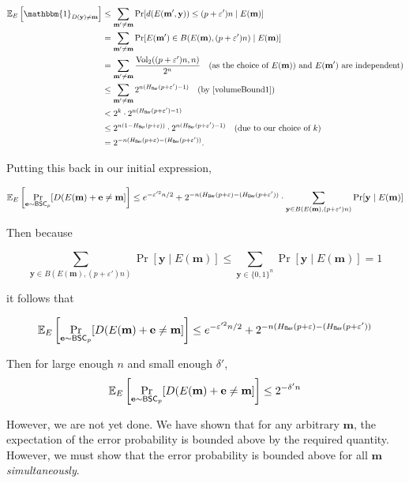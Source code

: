\begin{align*}
    \expec_E\left[\mathbbm{1}_{D(\textbf{y})\neq \textbf{m}}\right] &\leq \sum_{\textbf{m}'\neq \textbf{m}} \Pr[d(E(\textbf{m}', \textbf{y}))\leq (p+\varepsilon')n\mid E(\textbf{m})] \\
    &= \sum_{\textbf{m}'\neq \textbf{m}} \Pr[E(\textbf{m}')\in B(E(\textbf{m}), (p+\varepsilon')n)\mid E(\textbf{m})] \\
    &= \sum_{\textbf{m}'\neq \textbf{m}} \frac{\Vol_2((p+\varepsilon')n, n)}{2^n} \quad\text{(as the choice of $E(\textbf{m})$) and $E(\textbf{m}')$ are independent)} \\
    &\leq \sum_{\textbf{m}'\neq \textbf{m}} 2^{n(H_\mathsf{Ber}(p+\varepsilon')-1)}\quad\text{(by \ref{volumeBound1})} \\
    &< 2^k\cdot 2^{n(H_\mathsf{Ber}(p+\varepsilon')-1)} \\
    &\leq 2^{n(1-H_\mathsf{Ber}(p+\varepsilon))}\cdot 2^{n(H_\mathsf{Ber}(p+\varepsilon')-1)}\quad\text{(due to our choice of $k$)} \\
    &= 2^{-n(H_\mathsf{Ber}(p+\varepsilon)-(H_\mathsf{Ber}(p+\varepsilon'))}.
\end{align*}

Putting this back in our initial expression, 

$$\mathbb{E}_E\left[\Pr_{\textbf{e}\sim\mathsf{BSC}_p}[D(E(\textbf{m})+\textbf{e}\neq \textbf{m}]\right]
\leq
e^{-\varepsilon'^2n/2} +
2^{-n(H_\mathsf{Ber}(p+\varepsilon)-(H_\mathsf{Ber}(p+\varepsilon'))} \cdot
\sum_{\textbf{y}\in B(E(\textbf{m}), (p+\varepsilon')n)}\Pr[\textbf{y}\mid E(\textbf{m})]$$

Then because

$$\sum_{\textbf{y}\in B(E(\textbf{m}), (p+\varepsilon')n)}\Pr[\textbf{y}\mid E(\textbf{m})]\leq \sum_{\textbf{y}\in \{0,1\}^n}\Pr[\textbf{y}\mid E(\textbf{m})]=1$$

it follows that

$$\mathbb{E}_E\left[\Pr_{\textbf{e}\sim\mathsf{BSC}_p}[D(E(\textbf{m})+\textbf{e}\neq \textbf{m}]\right]
\leq
e^{-\varepsilon'^2n/2} +
2^{-n(H_\mathsf{Ber}(p+\varepsilon)-(H_\mathsf{Ber}(p+\varepsilon'))}$$

Then for large enough $n$ and small enough $\delta'$, 
$$\mathbb{E}_E\left[\Pr_{\textbf{e}\sim\mathsf{BSC}_p}[D(E(\textbf{m})+\textbf{e}\neq \textbf{m}]\right]
\leq
2^{-\delta'n}
$$

However, we are not yet done. We have shown that for any arbitrary $\textbf{m}$, the expectation of the error probability is bounded above by the required quantity. However, we must show that the error probability is bounded above for all $\textbf{m}$ \textit{simultaneously}.

